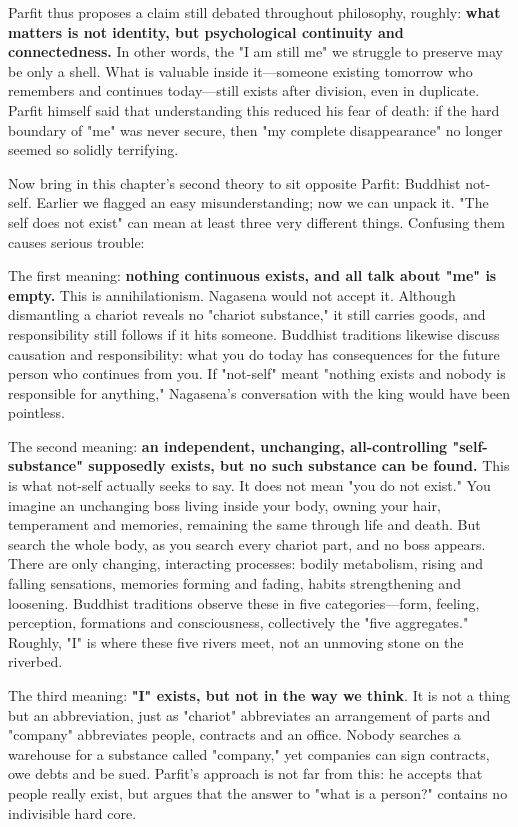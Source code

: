 Parfit thus proposes a claim still debated throughout philosophy, roughly: \textbf{what matters is not identity, but psychological continuity and connectedness.} In other words, the "I am still me" we struggle to preserve may be only a shell. What is valuable inside it---someone existing tomorrow who remembers and continues today---still exists after division, even in duplicate. Parfit himself said that understanding this reduced his fear of death: if the hard boundary of "me" was never secure, then "my complete disappearance" no longer seemed so solidly terrifying.

Now bring in this chapter's second theory to sit opposite Parfit: Buddhist not-self. Earlier we flagged an easy misunderstanding; now we can unpack it. "The self does not exist" can mean at least three very different things. Confusing them causes serious trouble:

The first meaning: \textbf{nothing continuous exists, and all talk about "me" is empty.} This is annihilationism. Nagasena would not accept it. Although dismantling a chariot reveals no "chariot substance," it still carries goods, and responsibility still follows if it hits someone. Buddhist traditions likewise discuss causation and responsibility: what you do today has consequences for the future person who continues from you. If "not-self" meant "nothing exists and nobody is responsible for anything," Nagasena's conversation with the king would have been pointless.

The second meaning: \textbf{an independent, unchanging, all-controlling "self-substance" supposedly exists, but no such substance can be found.} This is what not-self actually seeks to say. It does not mean "you do not exist." You imagine an unchanging boss living inside your body, owning your hair, temperament and memories, remaining the same through life and death. But search the whole body, as you search every chariot part, and no boss appears. There are only changing, interacting processes: bodily metabolism, rising and falling sensations, memories forming and fading, habits strengthening and loosening. Buddhist traditions observe these in five categories---form, feeling, perception, formations and consciousness, collectively the "five aggregates." Roughly, "I" is where these five rivers meet, not an unmoving stone on the riverbed.

The third meaning: \textbf{"I" exists, but not in the way we think}. It is not a thing but an abbreviation, just as "chariot" abbreviates an arrangement of parts and "company" abbreviates people, contracts and an office. Nobody searches a warehouse for a substance called "company," yet companies can sign contracts, owe debts and be sued. Parfit's approach is not far from this: he accepts that people really exist, but argues that the answer to "what is a person?" contains no indivisible hard core.

